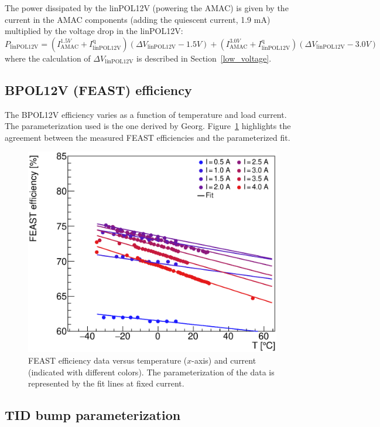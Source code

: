 The power dissipated by the linPOL12V (powering the AMAC) is given by the current in the AMAC components
(adding the quiescent current, 1.9 mA) multiplied by the voltage drop in the linPOL12V:
\begin{equation}
P_\text{linPOL12V} = (I^{1.5V}_\text{AMAC} + I^\text{q}_\text{linPOL12V})\left(  \Delta V_\text{linPOL12V} - 1.5V \right)
                   + (I^{3.0V}_\text{AMAC} + I^\text{q}_\text{linPOL12V})\left(  \Delta V_\text{linPOL12V} - 3.0V \right)
\label{eq:amac_regulator}
\end{equation}
where the calculation of $\Delta V_\text{linPOL12V}$ is described in Section~\ref{low_voltage}.

\subsection{BPOL12V (FEAST) efficiency}

The BPOL12V efficiency varies as a function of temperature and load current. The parameterization used
is the one derived by Georg. Figure~\ref{feast_vs_temperature} highlights the agreement between the
measured FEAST efficiencies and the parameterized fit.

\begin{figure}[ht!]
\begin{center}
\includegraphics[width=0.49\linewidth]{figures/FeastEfficiency_isoCurrent}
\end{center}
\caption{FEAST efficiency data versus temperature ($x$-axis) and current (indicated with different
colors). The parameterization of the data is represented by the fit lines at fixed current.
}
\label{feast_vs_temperature}
\end{figure}

\subsection{TID bump parameterization}
\label{tid_parameterization_details}

